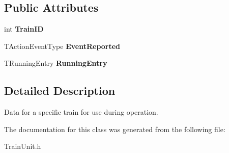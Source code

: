 \subsection*{Public Attributes}
\begin{DoxyCompactItemize}
\item 
\mbox{\label{class_t_train_operating_data_aa75dba204a2655d41e74c42694e92b81}} 
int {\bfseries Train\+ID}
\item 
\mbox{\label{class_t_train_operating_data_afd7bc1b962e312062e0d27f0380e8c69}} 
T\+Action\+Event\+Type {\bfseries Event\+Reported}
\item 
\mbox{\label{class_t_train_operating_data_a9a46cddc0bed9cbbfff18b8909ae8047}} 
T\+Running\+Entry {\bfseries Running\+Entry}
\end{DoxyCompactItemize}


\subsection{Detailed Description}
Data for a specific train for use during operation. 

The documentation for this class was generated from the following file\+:\begin{DoxyCompactItemize}
\item 
Train\+Unit.\+h\end{DoxyCompactItemize}
